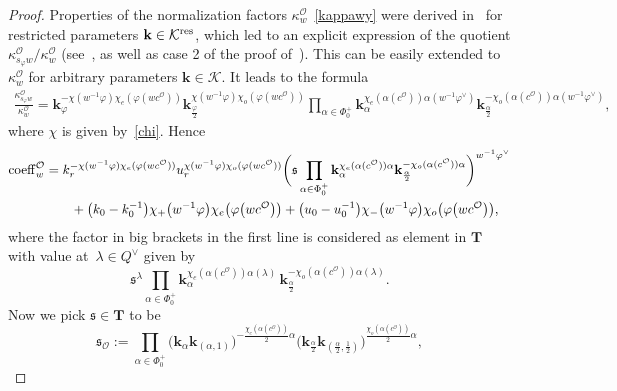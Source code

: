 \begin{proof}
Properties of the normalization factors $\kappa_w^\mathcal{O}$~\eqref{kappawy}
were derived in~\cite{SSV2} for restricted parameters $\mathbf{k}\in\mathcal{K}^{{\rm res}}$, which led to an explicit expression of the quotient $\kappa_{s_\varphi w}^\mathcal{O}/\kappa_w^\mathcal{O}$ (see~\cite[Lemma 5.6\,(1)]{SSV2}, as well as case 2 of the proof of~\cite[Lemma 5.9]{SSV2}).
This can be easily extended to $\kappa_w^\mathcal{O}$ for arbitrary parameters $\mathbf{k}\in\mathcal{K}$. It leads to the formula
\begin{gather*}
\frac{\kappa_{s_\varphi w}^\mathcal{O}}{\kappa_w^\mathcal{O}}=\mathbf{k}_\varphi^{-\chi(w^{-1}\varphi)\chi_e(\varphi(wc^\mathcal{O}))}
\mathbf{k}_{\frac{\varphi}{2}}^{\chi(w^{-1}\varphi)\chi_o(\varphi(wc^\mathcal{O}))}
\prod_{\alpha\in\Phi_0^+}\mathbf{k}_\alpha^{\chi_e(\alpha(c^\mathcal{O}))\alpha(w^{-1}\varphi^\vee)}\mathbf{k}_{\frac{\alpha}{2}}^{-\chi_o(\alpha(c^\mathcal{O}))\alpha(w^{-1}\varphi^\vee)},
\end{gather*}
where $\chi$ is given by~\eqref{chi}. Hence
\begin{gather*}
{\rm coeff}_w^\mathcal{O}=k_r^{-\chi(w^{-1}\varphi)\chi_e(\varphi(wc^\mathcal{O}))}u_r^{\chi(w^{-1}\varphi)\chi_o(\varphi(wc^\mathcal{O}))}
\biggl(\mathfrak{s}\prod_{\alpha\in\Phi_0^+}\mathbf{k}_\alpha^{\chi_e(\alpha(c^\mathcal{O}))\alpha} \mathbf{k}_{\frac{\alpha}{2}}^{-\chi_o(\alpha(c^\mathcal{O}))\alpha}\biggr)^{w^{-1}\varphi^\vee}\\
\hphantom{{\rm coeff}_w^\mathcal{O}=}{}
+\bigl(k_0-k_0^{-1}\bigr)\chi_+\bigl(w^{-1}\varphi\bigr)\chi_e\bigl(\varphi\bigl(wc^\mathcal{O}\bigr)\bigr)+
\bigl(u_0-u_0^{-1}\bigr)\chi_-\bigl(w^{-1}\varphi\bigr)\chi_o\bigl(\varphi\bigl(wc^\mathcal{O}\bigr)\bigr),
\end{gather*}
where the factor in big brackets in the first line is considered as element in $\mathbf{T}$ with value at~${\lambda\in Q^\vee}$ given by
\[
\mathfrak{s}^\lambda\prod_{\alpha\in\Phi_0^+}\mathbf{k}_\alpha^{\chi_e(\alpha(c^\mathcal{O}))\alpha(\lambda)}\,\mathbf{k}_{\frac{\alpha}{2}}^{-\chi_o(\alpha(c^\mathcal{O}))\alpha(\lambda)}.
\]
Now we pick $\mathfrak{s}\in\mathbf{T}$ to be
\begin{equation}\label{s}
\mathfrak{s}_\mathcal{O}:=\prod_{\alpha\in\Phi_0^+}\bigl(\mathbf{k}_{\alpha}\mathbf{k}_{(\alpha,1)}\bigr)^{-\frac{\chi_e(\alpha(c^\mathcal{O}))}{2}\alpha}
\bigl(\mathbf{k}_{\frac{\alpha}{2}}\mathbf{k}_{(\frac{\alpha}{2},\frac{1}{2})}\bigr)^{\frac{\chi_o(\alpha(c^\mathcal{O}))}{2}\alpha},
\end{equation}

\end{proof}
